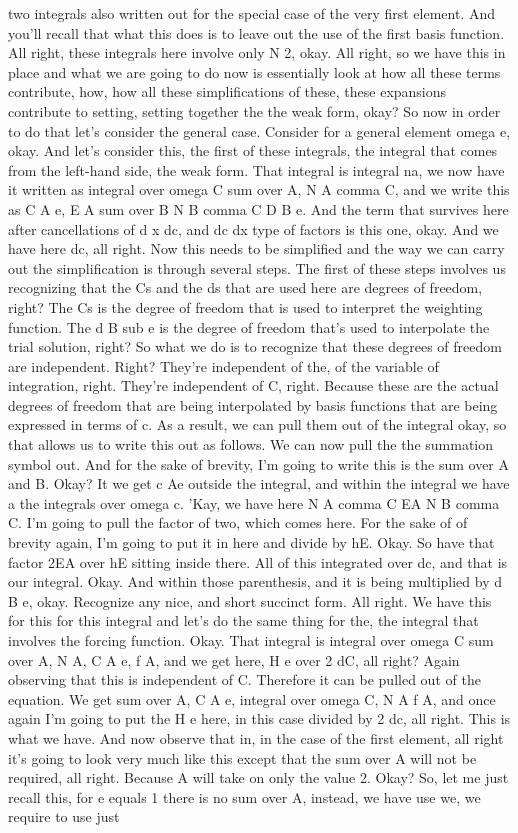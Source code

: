 \documentclass[10pt]{article}
\begin{document}
two integrals also written out for the special case of the very first element. And you'll recall that what this does is to leave out the use of the first basis function. All right, these integrals here involve only N 2, okay. All right, so we have this in place and what we are going to do now is essentially look at how all these terms contribute, how, how all these simplifications of these, these expansions contribute to setting, setting together the the weak form, okay? So now in order to do that let's consider the general case. Consider for a general element omega e, okay. And let's consider this, the first of these integrals, the integral that comes from the left-hand side, the weak form. That integral is integral na, we now have it written as integral over omega C sum over A, N A comma C, and we write this as C A e, E A sum over B N B comma C D B e. And the term that survives here after cancellations of d x dc, and dc dx type of factors is this one, okay. And we have here dc, all right. Now this needs to be simplified and the way we can carry out the simplification is through several steps. The first of these steps involves us recognizing that the Cs and the ds that are used here are degrees of freedom, right? The Cs is the degree of freedom that is used to interpret the weighting function. The d B sub e is the degree of freedom that's used to interpolate the trial solution, right? So what we do is to recognize that these degrees of freedom are independent. Right? They're independent of the, of the variable of integration, right. They're independent of C, right. Because these are the actual degrees of freedom that are being interpolated by basis functions that are being expressed in terms of c. As a result, we can pull them out of the integral okay, so that allows us to write this out as follows. We can now pull the the summation symbol out. And for the sake of brevity, I'm going to write this is the sum over A and B. Okay? It we get c Ae outside the integral, and within the integral we have a the integrals over omega c. 'Kay, we have here N A comma C EA N B comma C. I'm going to pull the factor of two, which comes here. For the sake of of brevity again, I'm going to put it in here and divide by hE. Okay. So have that factor 2EA over hE sitting inside there. All of this integrated over dc, and that is our integral. Okay. And within those parenthesis, and it is being multiplied by d B e, okay. Recognize any nice, and short succinct form. All right. We have this for this for this integral and let's do the same thing for  the, the integral that involves the forcing function. Okay. That integral is integral over omega C sum over A, N A, C A e, f A, and we get here, H e over 2 dC, all right? Again observing that this is independent of C. Therefore it can be pulled out of the equation. We get sum over A, C A e, integral over omega C, N A f A, and once again I'm going to put the H e here, in this case divided by 2 dc, all right. This is what we have. And now observe that in, in the case of the first element, all right it's going to look very much like this except that the sum over A will not be required, all right. Because A will take on only the value 2. Okay? So, let me just recall this, for e equals 1 there is no sum over A, instead, we have use we, we require to use just 
\end{document}
